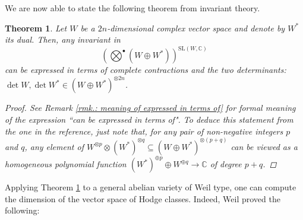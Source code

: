 \documentclass[11pt,twoside,a4paper]{amsart}
\newcommand{\0}{\mathscr{O}}
\newcommand{\C}{\mathbb{C}}
\theoremstyle{plain}
\newtheorem{thm}{Theorem}[section]
\theoremstyle{definition}
\theoremstyle{remark}
\begin{document}
\smallskip

We are now able to state the following theorem from invariant theory.
\begin{thm}\cite[Thm.\ 8.4]{kraft1996classical}
\label{Thm: invariants under SL}
Let $W$ be a $2n$-dimensional complex vector space and denote by $W^*$ its dual. Then, any invariant in 
\[
\textstyle\left(\bigotimes^{\bullet}(W\oplus W^*)\right)^{\mathrm{SL}(W,\C)}
\]
can be expressed in terms of complete contractions and the two determinants: $\det W, \det W^*\in (W\oplus W^*)^{\otimes 2n}$.
\begin{proof}
See Remark \ref{rmk.: meaning of expressed in terms of} for formal meaning of the expression \textquotedblleft can be expressed in terms of". To deduce this statement from the one in the reference, just note that, for any pair of non-negative integers $p$ and $q$, any element of $W^{\otimes p}\otimes (W^*)^{\otimes q}\subseteq(W\oplus W^*)^{\otimes (p+q)}$ can be viewed as a homogeneous polynomial function $(W^*)^{\oplus p}\oplus W^{\oplus q}\rightarrow \C$ of degree $p+q$.
\end{proof}
\end{thm}
Applying Theorem \ref{Thm: invariants under SL} to a general abelian variety of Weil type, one can compute the dimension of the vector space of Hodge classes. Indeed, Weil proved the following:
\end{document}
